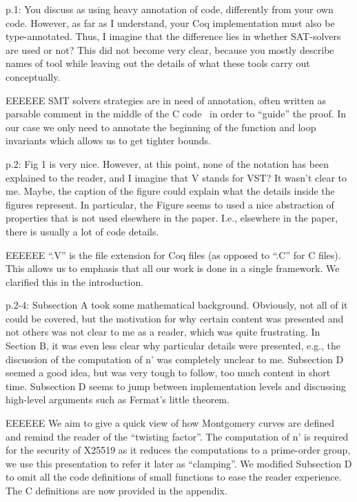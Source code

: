 p.1: You discuss \cite{Ber06} as using heavy annotation of code,
differently from your own code. However, as far as I understand,
your Coq implementation must also be type-annotated. Thus,
I imagine that the difference lies in whether SAT-solvers are
used or not? This did not become very clear, because you
mostly describe names of tool while leaving out the details of
what these tools carry out conceptually.

\begin{answer}{EEEEEE}
  SMT solvers strategies are in need of annotation, often written
  as parsable comment in the middle of the C code~\cite{acsl}
  in order to ``guide'' the proof. In our case we only need to
  annotate the beginning of the function and loop invariants
  which allows us to get tighter bounds.
\end{answer}

p.2: Fig 1 is very nice. However, at this point, none of
the notation has been explained to the reader, and I imagine
that V stands for VST? It wasn't clear to me. Maybe, the
caption of the figure could explain what the details inside the
figures represent. In particular, the Figure seems to used a
nice abstraction of properties that is not used elsewhere in
the paper. I.e., elsewhere in the paper, there is usually a lot
of code details.

\begin{answer}{EEEEEE}
  ``.V'' is the file extension for Coq files (as opposed to ``.C'' for C
  files). This allows us to emphasis that all our work is done
  in a single framework. We clarified this in the introduction.
\end{answer}

p.2-4: Subsection A took some mathematical background.
Obviously, not all of it could be covered, but the motivation
for why certain content was presented and not others was not
clear to me as a reader, which was quite frustrating. In Section
B, it was even less clear why particular details were presented,
e.g., the discussion of the computation of n’ was completely
unclear to me. Subsection D seemed a good idea, but was very
tough to follow, too much content in short time. Subsection D
seems to jump between implementation levels and discussing
high-level arguments such as Fermat’s little theorem.

\begin{answer}{EEEEEE}
  We aim to give a quick view of how Montgomery curves are
  defined and remind the reader of the ``twisting factor''. The
  computation of n' is required for the security of X25519 as
  it reduces the computations to a prime-order group, we use
  this presentation to refer it later as ``clamping''. We
  modified Subsection D to omit all the code definitions of small
  functions to ease the reader experience. The C definitions
  are now provided in the appendix.
\end{answer}

